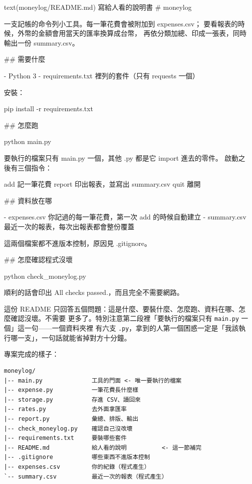 \begin{code}{text}{(moneylog/README.md) 寫給人看的說明書}
# moneylog

一支記帳的命令列小工具。每一筆花費會被附加到 expenses.csv；
要看報表的時候，外幣的金額會用當天的匯率換算成台幣，
再依分類加總、印成一張表，同時輸出一份 summary.csv。

## 需要什麼

- Python 3
- requirements.txt 裡列的套件（只有 requests 一個）

安裝：

    pip install -r requirements.txt

## 怎麼跑

    python main.py

要執行的檔案只有 main.py 一個，其他 .py 都是它 import 進去的零件。
啟動之後有三個指令：

    add      記一筆花費
    report   印出報表，並寫出 summary.csv
    quit     離開

## 資料放在哪

- expenses.csv   你記過的每一筆花費，第一次 add 的時候自動建立
- summary.csv    最近一次的報表，每次出報表都會整份覆蓋

這兩個檔案都不進版本控制，原因見 .gitignore。

## 怎麼確認程式沒壞

    python check_moneylog.py

順利的話會印出 All checks passed.，而且完全不需要網路。
\end{code}

這份 README 只回答五個問題：這是什麼、要裝什麼、怎麼跑、資料在哪、怎麼確認沒壞。不需要
更多了。特別注意第二段裡「要執行的檔案只有 \texttt{main.py} 一個」這一句——一個資料夾裡
有六支 \texttt{.py}，拿到的人第一個困惑一定是「我該執行哪一支」，一句話就能省掉對方十分鐘。

專案完成的樣子：

\begin{verbatim}
moneylog/
|-- main.py              工具的門面 <- 唯一要執行的檔案
|-- expense.py           一筆花費長什麼樣
|-- storage.py           存進 CSV、讀回來
|-- rates.py             去外面拿匯率
|-- report.py            彙總、排版、輸出
|-- check_moneylog.py    確認自己沒改壞
|-- requirements.txt     要裝哪些套件
|-- README.md            給人看的說明          <- 這一節補完
|-- .gitignore           哪些東西不進版本控制
|-- expenses.csv         你的紀錄（程式產生）
`-- summary.csv          最近一次的報表（程式產生）
\end{verbatim}

